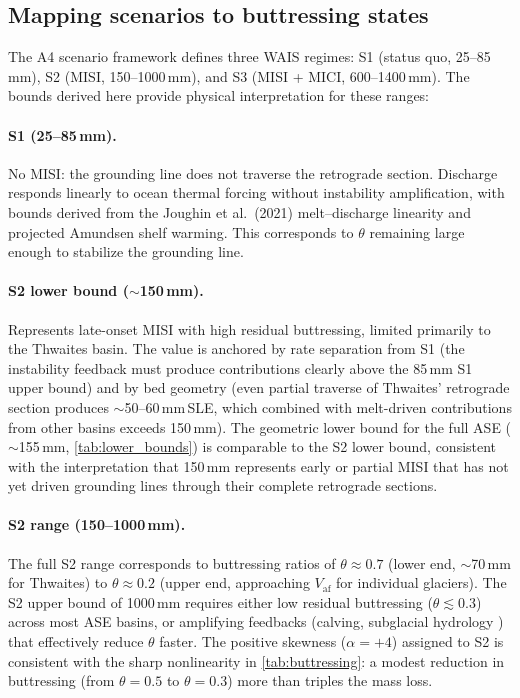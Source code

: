 \documentclass[11pt]{article}
\newcommand{\Vaf}{V_{\mathrm{af}}}
\begin{document}
\subsection{Mapping scenarios to buttressing states}

The A4 scenario framework defines three WAIS regimes: S1 (status quo, 25--85\,mm), S2 (MISI, 150--1000\,mm), and S3 (MISI + MICI, 600--1400\,mm). The bounds derived here provide physical interpretation for these ranges:

\paragraph{S1 (25--85\,mm).} No MISI: the grounding line does not traverse the retrograde section. Discharge responds linearly to ocean thermal forcing without instability amplification, with bounds derived from the Joughin et al.\ (2021) melt--discharge linearity and projected Amundsen shelf warming. This corresponds to $\theta$ remaining large enough to stabilize the grounding line.

\paragraph{S2 lower bound ($\sim$150\,mm).} Represents late-onset MISI with high residual buttressing, limited primarily to the Thwaites basin. The value is anchored by rate separation from S1 (the instability feedback must produce contributions clearly above the 85\,mm S1 upper bound) and by bed geometry (even partial traverse of Thwaites' retrograde section produces $\sim$50--60\,mm\,SLE, which combined with melt-driven contributions from other basins exceeds 150\,mm). The geometric lower bound for the full ASE ($\sim$155\,mm, \cref{tab:lower_bounds}) is comparable to the S2 lower bound, consistent with the interpretation that 150\,mm represents early or partial MISI that has not yet driven grounding lines through their complete retrograde sections.

\paragraph{S2 range (150--1000\,mm).} The full S2 range corresponds to buttressing ratios of $\theta \approx 0.7$ (lower end, $\sim$70\,mm for Thwaites) to $\theta \approx 0.2$ (upper end, approaching $\Vaf$ for individual glaciers). The S2 upper bound of 1000\,mm requires either low residual buttressing ($\theta \lesssim 0.3$) across most ASE basins, or amplifying feedbacks (calving, subglacial hydrology \citep{Dow2022}) that effectively reduce $\theta$ faster. The positive skewness ($\alpha = +4$) assigned to S2 is consistent with the sharp nonlinearity in \cref{tab:buttressing}: a modest reduction in buttressing (from $\theta = 0.5$ to $\theta = 0.3$) more than triples the mass loss.
\end{document}
